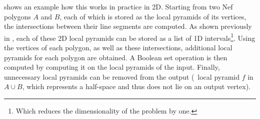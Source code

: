  shows an example how this works in practice in 2D.
Starting from two Nef polygons $A$ and $B$, each of which is stored as the local pyramids of its vertices, the intersections between their line segments are computed.
As shown previously in , each of these 2D local pyramids can be stored as a list of 1D intervals\footnote{Which reduces the dimensionality of the problem by one.}.
Using the vertices of each polygon, as well as these intersections, additional local pyramids for each polygon are obtained.
A Boolean set operation is then computed by computing it on the local pyramids of the input.
Finally, unnecessary local pyramids can be removed from the output (\eg\ local pyramid $f$ in $A \cup B$, which represents a half-space and thus does not lie on an output vertex).
\begin{figure}[tb]
\centering
{}

\end{figure}
